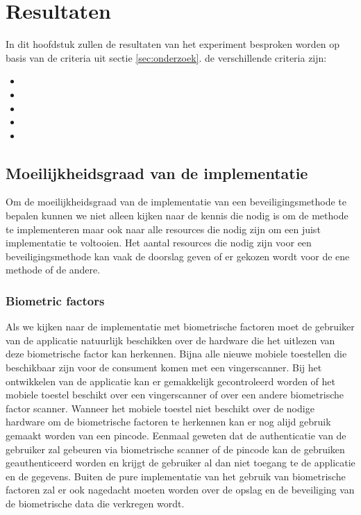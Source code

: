 
\chapter{Resultaten}
\label{ch:resultaten}

In dit hoofdstuk zullen de resultaten van het experiment besproken worden op basis van de criteria uit sectie \ref{sec:onderzoek}. de verschillende criteria zijn: 
\begin{itemize}
	\item {}
	\item {}
	\item {}
	\item {}
	\item {}
\end{itemize}

\section{Moeilijkheidsgraad van de implementatie}
\label{sec:moeilijheid}

Om de moeilijkheidsgraad van de implementatie van een beveiligingsmethode te bepalen kunnen we niet alleen kijken naar de kennis die nodig is om de methode te implementeren maar ook naar alle resources die nodig zijn om een juist implementatie te voltooien. Het aantal resources die nodig zijn voor een beveiligingsmethode kan vaak de doorslag geven of er gekozen wordt voor de ene methode of de andere.

\subsection{Biometric factors}
Als we kijken naar de implementatie met biometrische factoren moet de gebruiker van de applicatie natuurlijk beschikken over de hardware die het uitlezen van deze biometrische factor kan herkennen. Bijna alle nieuwe mobiele toestellen die beschikbaar zijn voor de consument komen met een vingerscanner. Bij het ontwikkelen van de applicatie kan er gemakkelijk gecontroleerd worden of het mobiele toestel beschikt over een vingerscanner of over een andere biometrische factor scanner. Wanneer het mobiele toestel niet beschikt over de nodige hardware om de biometrische factoren te herkennen kan er nog alijd gebruik gemaakt worden van een pincode. Eenmaal geweten dat de authenticatie van de gebruiker zal gebeuren via biometrische scanner of de pincode kan de gebruiken geauthenticeerd worden en krijgt de gebruiker al dan niet toegang te de applicatie en de gegevens. Buiten de pure implementatie van het gebruik van biometrische factoren zal er ook nagedacht moeten worden over de opslag en de beveiliging van de biometrische data die verkregen wordt. 

